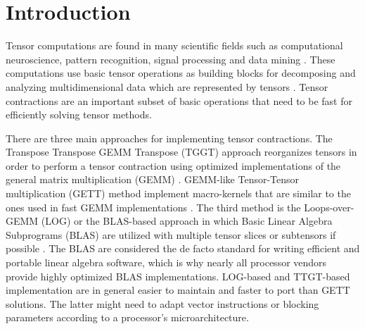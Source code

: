 \section{Introduction}
\label{sec:introduction}
Tensor computations are found in many scientific fields such as computational neuroscience, pattern recognition, signal processing and data mining \citep{karahan:2015:tensor, papalexakis:2017:tensors, song:2019:tensor.completion, rieser:2023:tensor, wang:2023:tensor.decomposition}.
These computations use basic tensor operations as building blocks for decomposing and analyzing multidimensional data which are represented by tensors \citep{lee:2018:fundamental, kolda:2009:decompositions}. 
Tensor contractions are an important subset of basic operations that need to be fast for efficiently solving tensor methods.

There are three main approaches for implementing tensor contractions.
The Transpose Transpose GEMM Transpose (TGGT) approach reorganizes tensors in order to perform a tensor contraction using optimized implementations of the general matrix multiplication (GEMM) \citep{bader:2006:algorithm862,solomonik:2013:cyclops}.
GEMM-like Tensor-Tensor multiplication (GETT) method implement macro-kernels that are similar to the ones used in fast GEMM implementations \citep{springer:2018:design, matthews:2018:high}.
The third method is the Loops-over-GEMM (LOG) or the BLAS-based approach in which Basic Linear Algebra Subprograms (BLAS) are utilized with multiple tensor slices or subtensors if possible \citep{dinapoli:2014:towards.efficient.use, li:2015:input, shi:2016:tensor.contraction, bassoy:2019:ttv}.
The BLAS are considered the de facto standard for writing efficient and portable linear algebra software, which is why nearly all processor vendors provide highly optimized BLAS implementations.
LOG-based and TTGT-based implementation are in general easier to maintain and faster to port than GETT solutions.
The latter might need to adapt vector instructions or blocking parameters according to a processor's microarchitecture.


